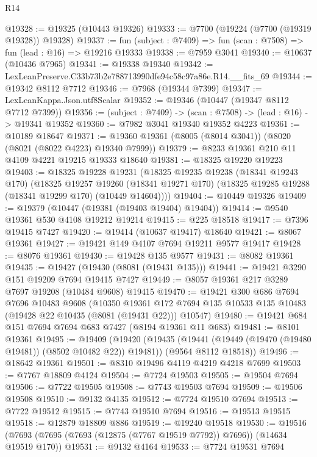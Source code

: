 \begin{lexlean}{R14}
\begin{coremodule}
@19328 := @19325 (@10443 @19326)
@19333 := @7700 (@19224 (@7700 (@19319 @19328)) @19328)
@19337 := fun (subject : @7409) => fun (scan : @7508) => fun (lead : @16) => @19216 @19333
@19338 := @7959 @3041
@19340 := @10637 (@10436 @7965)
@19341 := @19338 @19340
@19342 := LexLeanPreserve.C33b73b2e788713990dfe94c58c97a86e.R14.__fits_69
@19344 := @19342 @8112 @7712
@19346 := @7968 (@19344 @7399)
@19347 := LexLeanKappa.Json.utf8Scalar
@19352 := @19346 (@10447 (@19347 @8112 @7712 @7399))
@19356 := (subject : @7409) -> (scan : @7508) -> (lead : @16) -> @19341 @19352
@19360 := @7982 @3041 @19340 @19352 @4223
@19361 := @10189 @18647
@19371 := @19360 @19361 (@8005 (@8014 @3041)) (@8020 (@8021 (@8022 @4223) @19340 @7999))
@19379 := @8233 @19361 @210 @11 @4109 @4221 @19215 @19333 @18640
@19381 := @18325 @19220 @19223
@19403 := @18325
    @19228
    @19231
    (@18325
      @19235
      @19238
      (@18341 @19243 @170)
      (@18325
        @19257
        @19260
        (@18341 @19271 @170)
        (@18325 @19285 @19288 (@18341 @19299 @170) (@10449 @14604))))
@19404 := @10449 @19326
@19409 := @19379 (@10447 (@19381 (@19403 @19404) @19404))
@19414 := @9540 @19361 @530 @4108 @19212 @19214
@19415 := @225 @18518
@19417 := @7396 @19415 @7427
@19420 := @19414 (@10637 @19417) @18640
@19421 := @8067 @19361
@19427 := @19421 @149 @4107 @7694 @19211 @9577 @19417
@19428 := @8076 @19361
@19430 := @19428 @135 @9577
@19431 := @8082 @19361
@19435 := @19427 (@19430 (@8081 (@19431 @135)))
@19441 := @19421 @3290 @151 @19209 @7694 @19415 @7427
@19449 := @8057 @19361 @217 @3289 @7697 @19208 (@10484 @9608) @19415
@19470 := @19421
    @300
    @686
    @7694
    @7696
    @10483
    @9608
    (@10350
      @19361
      @172
      @7694
      @135
      @10533
      @135
      @10483
      (@19428 @22 @10435 (@8081 (@19431 @22)))
      @10547)
@19480 := @19421 @684 @151 @7694 @7694 @683 @7427 (@8194 @19361 @11 @683)
@19481 := @8101 @19361
@19495 := @19409
    (@19420
      (@19435 (@19441 (@19449 (@19470 (@19480 @19481)) (@8502 @10482 @22)) @19481))
      (@9564 @8112 @18518))
@19496 := @18642 @19361
@19501 := @8310 @19496 @4119 @4219 @4218 @7699
@19503 := @7767 @18809 @4124
@19504 := @7724 @19503
@19505 := @19504 @7694
@19506 := @7722 @19505
@19508 := @7743 @19503 @7694
@19509 := @19506 @19508
@19510 := @9132 @4135
@19512 := @7724 @19510 @7694
@19513 := @7722 @19512
@19515 := @7743 @19510 @7694
@19516 := @19513 @19515
@19518 := @12879 @18809 @886
@19519 := @19240 @19518
@19530 := @19516 (@7693 (@7695 (@7693 (@12875 (@7767 @19519 @7792)) @7696)) (@14634 @19519 @170))
@19531 := @9132 @4164
@19533 := @7724 @19531 @7694

\end{coremodule}
\end{lexlean}
